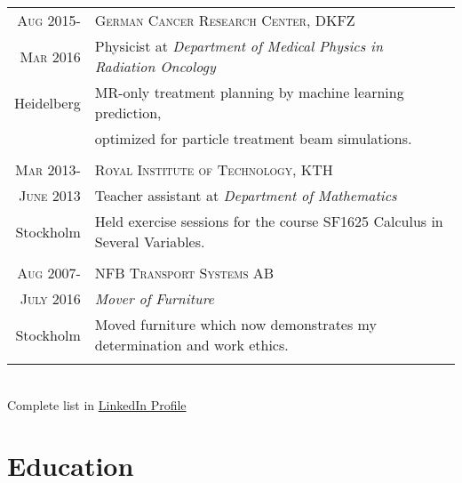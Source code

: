 \documentclass[a4paper,10pt]{article}
\begin{document}
{\begin{tabular}{r|p{16cm}}

 
 
 
 
 
 
 \textsc{Aug} 2015- & \textsc{German Cancer Research Center, DKFZ} \\
 \textsc{Mar} 2016& Physicist at \emph{Department of Medical Physics in Radiation Oncology}\\
 Heidelberg &\footnotesize{ MR-only treatment planning by machine learning prediction, } \\
 & \footnotesize{optimized for particle treatment beam simulations.} \\ \\
 
 
 \textsc{Mar} 2013- & \textsc{Royal Institute of Technology, KTH}\\
 \textsc{June} 2013 &Teacher assistant at \emph{Department of Mathematics}\\
 Stockholm&\footnotesize{Held exercise sessions for the course SF1625 Calculus in Several Variables. }\\ \\
 
 
 
\textsc{Aug} 2007- & \textsc{NFB Transport Systems AB}\\
 \textsc{July} 2016 & \emph{Mover of Furniture} \\
 
Stockholm & \footnotesize{Moved furniture which now demonstrates my determination and work ethics.} \\
  \\
\end{tabular}
\\
{\setlength\parindent{80pt} { \tiny Complete list in  \href{http://www.linkedin.com/in/danielbjorkman88}{LinkedIn Profile}} }
 \\
\section{Education}
 
\begin{tabular}{r|p{16cm}}
 

\end{tabular}}
\end{document}
